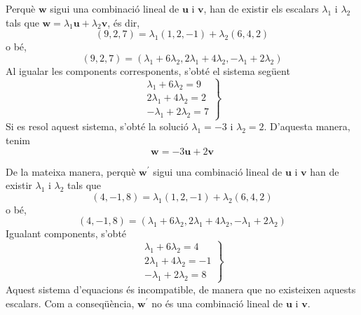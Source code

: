 \begin{solucio}
Perquè $\mathbf{w}$ sigui una combinació lineal de $\mathbf{u}$ i $%
\mathbf{v}$, han de existir els escalars $\lambda _{1}$ i $\lambda _{2}$
tals que $\mathbf{w}=\lambda _{1}\mathbf{u}+\lambda _{2}\mathbf{v}$, és
dir,%
\begin{equation*}
(9,2,7)=\lambda _{1}(1,2,-1)+\lambda _{2}(6,4,2)
\end{equation*}%
o bé,%
\begin{equation*}
(9,2,7)=(\lambda _{1}+6\lambda _{2},2\lambda _{1}+4\lambda _{2},-\lambda
_{1}+2\lambda _{2})
\end{equation*}%
Al igualar les components corresponents, s’obté el sistema següent%
\begin{equation*}
\left. 
\begin{array}{r}
\lambda _{1}+6\lambda _{2}=9 \\ 
2\lambda _{1}+4\lambda _{2}=2 \\ 
-\lambda _{1}+2\lambda _{2}=7%
\end{array}%
\right\}
\end{equation*}%
Si es resol aquest sistema, s’obté la solució $\lambda _{1}=-3$ i $%
\lambda _{2}=2$. D’aquesta manera, tenim%
\begin{equation*}
\mathbf{w}=-3\mathbf{u}+2\mathbf{v}
\end{equation*}

De la mateixa manera, perquè $\mathbf{w}^{\prime }$ sigui una combinació
lineal de $\mathbf{u}$ i $\mathbf{v}$ han de existir $\lambda _{1}$ i $%
\lambda _{2}$ tals que%
\begin{equation*}
(4,-1,8)=\lambda _{1}(1,2,-1)+\lambda _{2}(6,4,2)
\end{equation*}%
o bé,%
\begin{equation*}
(4,-1,8)=(\lambda _{1}+6\lambda _{2},2\lambda _{1}+4\lambda _{2},-\lambda
_{1}+2\lambda _{2})
\end{equation*}%
Igualant components, s’obté%
\begin{equation*}
\left. 
\begin{array}{r}
\lambda _{1}+6\lambda _{2}=4 \\ 
2\lambda _{1}+4\lambda _{2}=-1 \\ 
-\lambda _{1}+2\lambda _{2}=8%
\end{array}%
\right\}
\end{equation*}%
Aquest sistema d'equacions és incompatible, de manera que no existeixen aquests
escalars. Com a conseqüència, $\mathbf{w}^{\prime }$ no és una combinació lineal de $\mathbf{u}$ i $\mathbf{v}$.
\end{solucio}


